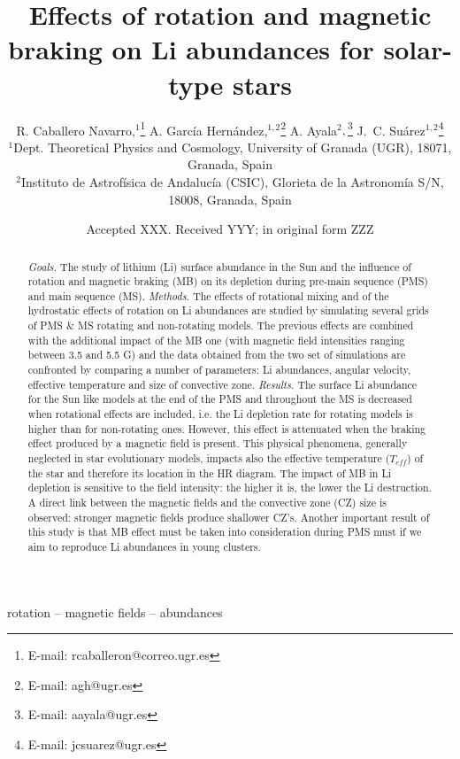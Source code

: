 \documentclass[fleqn,usenatbib]{mnras}
\title[Rotation, magnetic braking \& Li abundances]{Effects of rotation and magnetic braking on Li abundances for solar-type stars}
\author[R. Caballero Navarro et al.]{
R. Caballero Navarro,$^{1}$\thanks{E-mail: rcaballeron@correo.ugr.es}
A. Garc\'ia Hern\'andez,$^{1,2}$\thanks{E-mail: agh@ugr.es}
A. Ayala$^{2},$\thanks{E-mail: aayala@ugr.es}
J.~C. Su\'arez$^{1,2}$\thanks{E-mail: jcsuarez@ugr.es}
\\
$^{1}$Dept. Theoretical Physics and Cosmology, University of Granada (UGR), 18071, Granada, Spain\\
$^{2}$Instituto de Astrof\'isica de Andaluc\'ia (CSIC), Glorieta de la Astronom\'ia S/N, 18008, Granada, Spain\\
}
\date{Accepted XXX. Received YYY; in original form ZZZ}
\begin{document}
\label{firstpage}
\pagerange{\pageref{firstpage}--\pageref{lastpage}}
\maketitle

\begin{abstract}
\textit{Goals.} The study of lithium (Li) surface abundance in the Sun and the influence of rotation and magnetic braking (MB) on its depletion during pre-main sequence (PMS) and main sequence (MS).
\newline\textit{Methods.} The effects of rotational mixing and of the hydrostatic effects of rotation on Li abundances are studied by simulating several grids of PMS \& MS rotating and non-rotating models. The previous effects are combined with the additional impact of the MB one (with magnetic field intensities ranging between 3.5 and 5.5 G) and the data obtained from the two set of simulations are confronted by comparing a number of parameters: Li abundances, angular velocity, effective temperature and size of convective zone.
\newline\textit{Results.} The surface Li abundance for the Sun like models at the end of the PMS and throughout the MS is decreased when rotational effects are included, i.e. the Li depletion rate for rotating models is higher than for non-rotating ones. However, this effect is attenuated when the braking effect produced by a magnetic field is present. This physical phenomena, generally neglected in star evolutionary models, impacts also the effective temperature ($T_{eff}$) of the star and therefore its location in the HR diagram. The impact of MB in Li depletion is sensitive to the field intensity: the higher it is, the lower the Li destruction. A direct link between the magnetic fields and the convective zone (CZ) size is observed: stronger magnetic fields produce shallower CZ's. Another important result of this study is that MB effect must be taken into consideration during PMS must if we aim to reproduce Li abundances in young clusters.
\end{abstract}

\begin{keywords}
rotation -- magnetic fields -- abundances
\end{keywords}

\end{document}
